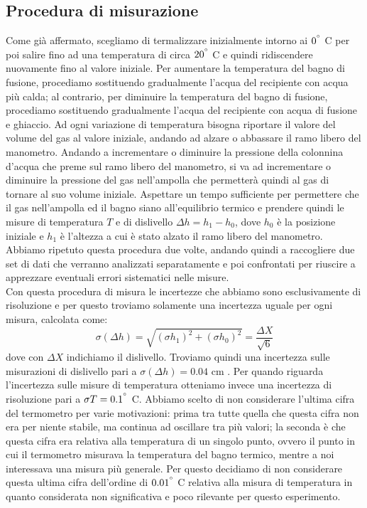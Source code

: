 \subsection{Procedura di misurazione}
Come già affermato, scegliamo di termalizzare inizialmente intorno ai $0^{\degree}$ C per poi salire fino ad una temperatura di circa $20^{\degree}$ C e quindi ridiscendere nuovamente fino al valore iniziale.
Per aumentare la temperatura del bagno di fusione, procediamo sostituendo gradualmente l'acqua del recipiente con acqua più calda; al contrario, per diminuire la temperatura del bagno di fusione, procediamo sostituendo gradualmente l'acqua del recipiente con acqua di fusione e ghiaccio.
Ad ogni variazione di temperatura bisogna riportare il valore del volume del gas al valore iniziale, andando ad alzare o abbassare il ramo libero del manometro.
Andando a incrementare o diminuire la pressione della colonnina d'acqua che preme sul ramo libero del manometro, si va ad incrementare o diminuire la pressione del gas nell'ampolla che permetterà quindi al gas di tornare al suo volume iniziale.
Aspettare un tempo sufficiente per permettere che il gas nell'ampolla ed il bagno siano all'equilibrio termico e prendere quindi le misure di temperatura $T$ e di dislivello $\Delta h = h_1 - h_0$, dove $h_0$ è la posizione iniziale e $h_1$ è l'altezza a cui è stato alzato il ramo libero del manometro.
Abbiamo ripetuto questa procedura due volte, andando quindi a raccogliere due set di dati che verranno analizzati separatamente e poi confrontati per riuscire a apprezzare eventuali errori sistematici nelle misure.
\\
Con questa procedura di misura le incertezze che abbiamo sono esclusivamente di risoluzione e per questo troviamo solamente una incertezza uguale per ogni misura, calcolata come:
\begin{equation}
\sigma (\Delta h) = \sqrt{(\sigma h_1)^2 + (\sigma h_0)^2} = \frac{\Delta X}{\sqrt{6}}
\end{equation}
dove con $\Delta X$ indichiamo il dislivello.
Troviamo quindi una incertezza sulle misurazioni di dislivello pari a $\sigma (\Delta h) = 0.04$ cm .
Per quando riguarda l'incertezza sulle misure di temperatura otteniamo invece una incertezza di risoluzione pari a $\sigma T = 0.1^{\degree}$ C.
Abbiamo scelto di non considerare l'ultima cifra del termometro per varie motivazioni: prima tra tutte quella che questa cifra non era per niente stabile, ma continua ad oscillare tra più valori; la seconda è che questa cifra era relativa alla temperatura di un singolo punto, ovvero il punto in cui il termometro misurava la temperatura del bagno termico, mentre a noi interessava una misura più generale.
Per questo decidiamo di non considerare questa ultima cifra dell'ordine di $0.01^{\degree}$ C relativa alla misura di temperatura in quanto considerata non significativa e poco rilevante per questo esperimento.

